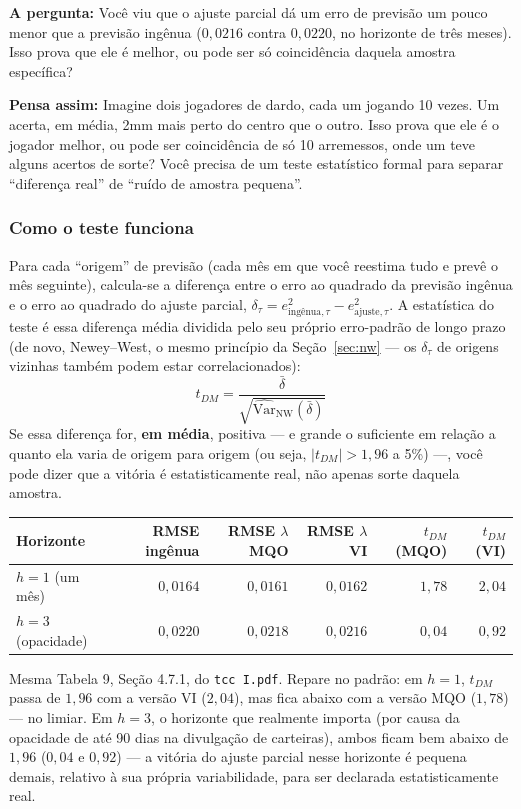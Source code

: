 \documentclass[11pt,a4paper]{article}
\newcommand{\pergunta}[1]{\par\vspace{4pt}\noindent\textbf{\color{azul}A pergunta:} #1\par\vspace{2pt}}
\newcommand{\analogia}[1]{\par\vspace{4pt}\noindent\textbf{\color{verde}Pensa assim:} #1\par\vspace{2pt}}
\begin{document}
\pergunta{Você viu que o ajuste parcial dá um erro de previsão um pouco menor que a previsão
ingênua ($0{,}0216$ contra $0{,}0220$, no horizonte de três meses). Isso prova que ele é melhor,
ou pode ser só coincidência daquela amostra específica?}

\analogia{Imagine dois jogadores de dardo, cada um jogando 10 vezes. Um acerta, em média, 2mm
mais perto do centro que o outro. Isso prova que ele é o jogador melhor, ou pode ser coincidência
de só 10 arremessos, onde um teve alguns acertos de sorte? Você precisa de um teste estatístico
formal para separar ``diferença real'' de ``ruído de amostra pequena''.}

\subsubsection*{Como o teste funciona}

Para cada ``origem'' de previsão (cada mês em que você reestima tudo e prevê o mês seguinte),
calcula-se a diferença entre o erro ao quadrado da previsão ingênua e o erro ao quadrado do
ajuste parcial, $\delta_\tau = e^{2}_{\text{ingênua},\tau} - e^{2}_{\text{ajuste},\tau}$. A
estatística do teste é essa diferença média dividida pelo seu próprio erro-padrão de longo prazo
(de novo, Newey--West, o mesmo princípio da Seção~\ref{sec:nw} --- os $\delta_\tau$ de origens
vizinhas também podem estar correlacionados):
$$t_{DM} = \frac{\bar\delta}{\sqrt{\widehat{\mathrm{Var}}_{\text{NW}}(\bar\delta)}}$$
Se essa diferença for, \textbf{em média}, positiva --- e grande o suficiente em relação a quanto
ela varia de origem para origem (ou seja, $|t_{DM}|>1{,}96$ a 5\%) ---, você pode dizer que a
vitória é estatisticamente real, não apenas sorte daquela amostra.

\begin{center}\small
\begin{tabular}{@{}lrrrrr@{}}
\toprule
Horizonte & RMSE ingênua & RMSE $\lambda$ MQO & RMSE $\lambda$ VI & $t_{DM}$ (MQO) & $t_{DM}$ (VI) \\
\midrule
$h=1$ (um mês)     & $0{,}0164$ & $0{,}0161$ & $0{,}0162$ & $1{,}78$ & $2{,}04$ \\
$h=3$ (opacidade)  & $0{,}0220$ & $0{,}0218$ & $0{,}0216$ & $0{,}04$ & $0{,}92$ \\
\bottomrule
\end{tabular}
\end{center}

Mesma Tabela 9, Seção 4.7.1, do \texttt{tcc I.pdf}. Repare no padrão: em $h=1$, $t_{DM}$ passa de
$1{,}96$ com a versão VI ($2{,}04$), mas fica abaixo com a versão MQO ($1{,}78$) --- no limiar. Em
$h=3$, o horizonte que realmente importa (por causa da opacidade de até 90 dias na divulgação de
carteiras), ambos ficam bem abaixo de $1{,}96$ ($0{,}04$ e $0{,}92$) --- a vitória do ajuste
parcial nesse horizonte é pequena demais, relativo à sua própria variabilidade, para ser
declarada estatisticamente real.
\end{document}
